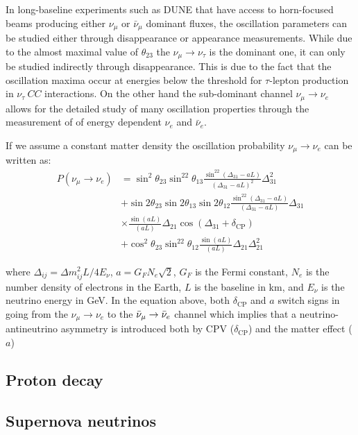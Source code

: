 In long-baseline experiments such as DUNE that have access to horn-focused beams producing either $\nu_\mu$ or $\bar{\nu}_\mu$ dominant fluxes, the oscillation parameters can be studied either through disappearance or appearance measurements. While due to the almost maximal value of $\theta_{23}$ the $\nu_\mu\rightarrow\nu_\tau$ is the dominant one, it can only be studied indirectly through disappearance. This is due to the fact that the oscillation maxima occur at energies below the threshold for $\tau$-lepton production in $\nu_\tau \ CC$ interactions. On the other hand the sub-dominant channel $\nu_\mu\rightarrow\nu_e$ allows for the detailed study of many oscillation properties through the measurement of of energy dependent $\nu_e$ and $\bar{\nu}_e$.

If we assume a constant matter density the oscillation probability $\nu_\mu\rightarrow\nu_e$ can be written as:
\begin{equation} \label{eq1}
    \begin{split}
        P(\nu_\mu\rightarrow\nu_e) & = \sin^2\theta_{23} \sin^22\theta_{13} \frac{\sin^22(\Delta_{31}-aL)}{(\Delta_{31}-aL)^2}\Delta_{31}^2\\
         &  +\sin2\theta_{23} \sin2\theta_{13} \sin2\theta_{12} \frac{\sin^22(\Delta_{31}-aL)}{(\Delta_{31}-aL)}\Delta_{31}\\
         & \times\frac{\sin(aL)}{(aL)}\Delta_{21} \cos(\Delta_{31}+\delta_\textrm{CP})\\
         & +\cos^2\theta_{23} \sin^22\theta_{12} \frac{\sin(aL)}{(aL)}\Delta_{21} \Delta_{21}^2
    \end{split}
\end{equation}

where $\Delta_{ij}=\Delta m_{ij}^2L/4E_\nu$, $a = G_FN_e\sqrt{2}$, $G_F$ is the Fermi constant, $N_e$ is the number density of electrons in the Earth, $L$ is the baseline in km, and $E_\nu$ is the neutrino energy in GeV. In the
equation above, both $\delta_\textrm{CP}$ and $a$ switch signs in going from the $\nu_\mu\rightarrow\nu_e$ to the $\bar{\nu}_\mu\rightarrow\Bar{\nu}_e$ channel which implies that a neutrino-antineutrino asymmetry is introduced both by CPV ($\delta_\textrm{CP}$) and the matter effect ($a$)
\clearpage

\subsection{Proton decay}
\subsection{Supernova neutrinos}
